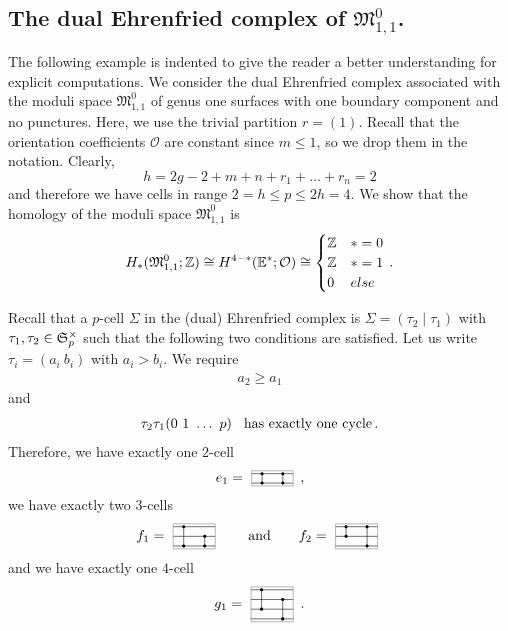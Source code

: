 \subsection{The dual Ehrenfried complex of \texorpdfstring{$\mathfrak M_{1,1}^0$}{M\_1,1\^0}.}

The following example is indented to give the reader a better understanding for explicit computations.
We consider the dual Ehrenfried complex associated with the moduli space $\mathfrak M_{1,1}^0$ of genus one surfaces with one boundary component and no punctures.
Here, we use the trivial partition $r = (1)$.
Recall that the orientation coefficients $\mathcal O$ are constant since $m \le 1$, so we drop them in the notation.
Clearly,
\[
    h = 2g - 2 + m + n + r_1 + \ldots + r_n = 2
\]
and therefore we have cells in range $2 = h \le p \le 2h = 4$.
We show that the homology of the moduli space $\mathfrak M_{1,1}^0$ is
\[
    H_{\ast}( \mathfrak M_{1,1}^0; \mathbb Z ) \cong H^{4 - \ast}( \mathbb E^\ast; \mathcal O ) \cong
        \begin{cases}
            \mathbb Z & \ast = 0 \\
            \mathbb Z & \ast = 1 \\
            0  & else
        \end{cases} \,.
\]

Recall that a $p$-cell $\Sigma$ in the (dual) Ehrenfried complex is $\Sigma = (\tau_2 \mid \tau_1)$ with $\tau_1, \tau_2 \in \mathfrak S_p^\times$
such that the following two conditions are satisfied.
Let us write $\tau_i = (a_i\ b_i)$ with $a_i > b_i$.
We require
\begin{align}
    a_2 \ge a_1
\end{align}
and
\begin{align}
    \tau_2\tau_1(0\ 1\ \ldots\ p) \hspace{2ex} \text{has exactly one cycle} \,.
\end{align}
Therefore, we have exactly one $2$-cell
\[
    e_1 = \zweizweizelle{2}{1}{2}{1} \,,
\]
we have exactly two $3$-cells
\[
    f_1 = \dreizweizelle{3}{1}{2}{1} \mspc{and}{20} f_2 = \dreizweizelle{3}{2}{3}{1}
\]
and we have exactly one $4$-cell
\[
    g_1 = \vierzweizelle{4}{2}{3}{1} \,.
\]

